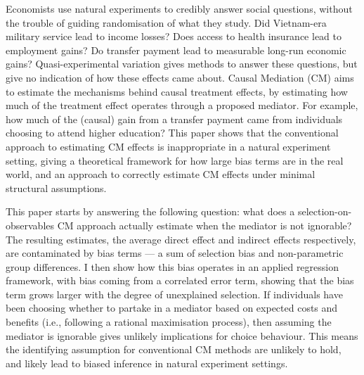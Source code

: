 Economists use natural experiments to credibly answer social questions, without the trouble of guiding randomisation of what they study.
Did Vietnam-era military service lead to income losses?
Does access to health insurance lead to employment gains?
Do transfer payment  lead to measurable long-run economic gains?
Quasi-experimental variation gives methods to answer these questions, but give no indication of how these effects came about.
Causal Mediation (CM) aims to estimate the mechanisms behind causal treatment effects, by estimating how much of the treatment effect operates through a proposed mediator.
For example, how much of the (causal) gain from a transfer payment came from individuals choosing to attend higher education?
This paper shows that the conventional approach to estimating CM effects is inappropriate in a natural experiment setting, giving a theoretical framework for how large bias terms are in the real world, and an approach to correctly estimate CM effects under minimal structural assumptions.

This paper starts by answering the following question: what does a selection-on-observables CM approach actually estimate when the mediator is not ignorable?
The resulting estimates, the average direct effect and indirect effects respectively, are contaminated by bias terms --- a sum of selection bias and non-parametric group differences.
I then show how this bias operates in an applied regression framework, with bias coming from a correlated error term, showing that the bias term grows larger with the degree of unexplained selection.
If individuals have been choosing whether to partake in a mediator based on expected costs and benefits (i.e., following a rational maximisation process), then assuming the mediator is ignorable gives unlikely implications for choice behaviour.
This means the identifying assumption for conventional CM methods are unlikely to hold, and likely lead to biased inference in natural experiment settings.

